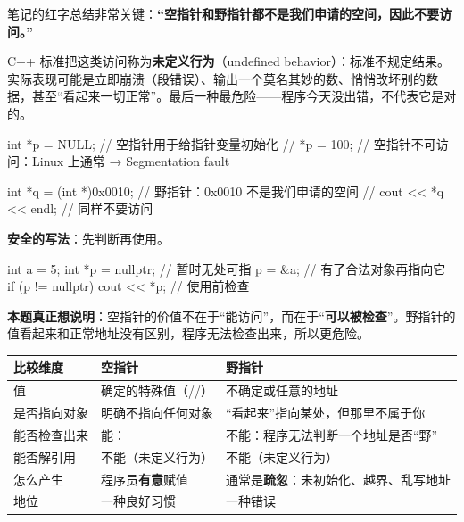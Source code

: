 \begin{intuitionbox}
笔记的红字总结非常关键：\textbf{“空指针和野指针都不是我们申请的空间，因此不要访问。”}

C++ 标准把这类访问称为\textbf{未定义行为}（undefined behavior）：标准不规定结果。实际表现可能是立即崩溃（段错误）、输出一个莫名其妙的数、悄悄改坏别的数据，甚至“看起来一切正常”。最后一种最危险——程序今天没出错，不代表它是对的。
\end{intuitionbox}

\begin{examplebox}
\begin{code}
int *p = NULL;       // 空指针用于给指针变量初始化
// *p = 100;         // 空指针不可访问：Linux 上通常 → Segmentation fault

int *q = (int *)0x0010;     // 野指针：0x0010 不是我们申请的空间
// cout << *q << endl;      // 同样不要访问
\end{code}
\textbf{安全的写法}：先判断再使用。
\begin{code}
int a = 5;
int *p = nullptr;             // 暂时无处可指
p = &a;                       // 有了合法对象再指向它
if (p != nullptr) cout << *p; // 使用前检查
\end{code}
\textbf{本题真正想说明}：空指针的价值不在于“能访问”，而在于“\textbf{可以被检查}”。野指针的值看起来和正常地址没有区别，程序无法检查出来，所以更危险。
\end{examplebox}

\begin{center}
\noindent\begin{tabularx}{\linewidth}{@{}p{2.3cm}YY@{}}
\toprule
{}比较维度 & 空指针 & 野指针 \\
\midrule
值 & 确定的特殊值（//） & 不确定或任意的地址 \\
是否指向对象 & 明确不指向任何对象 & “看起来”指向某处，但那里不属于你 \\
能否检查出来 & 能： & 不能：程序无法判断一个地址是否“野” \\
能否解引用 & 不能（未定义行为） & 不能（未定义行为） \\
怎么产生 & 程序员\textbf{有意}赋值 & 通常是\textbf{疏忽}：未初始化、越界、乱写地址 \\
地位 & 一种良好习惯 & 一种错误 \\
\bottomrule
\end{tabularx}
\end{center}


